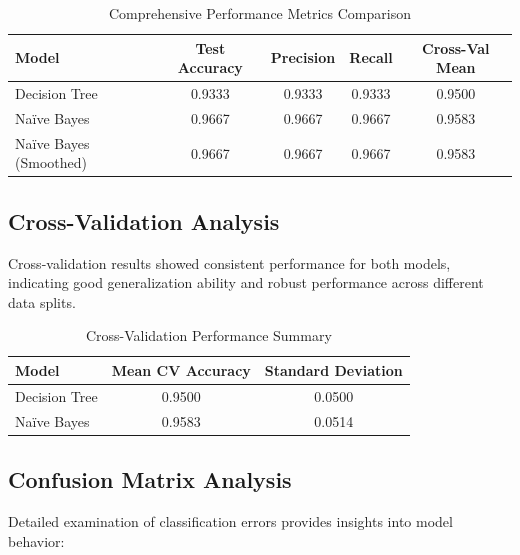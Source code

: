 \documentclass[12pt,a4paper]{article}
\newcommand{\tablealtrow}{\rowcolor{tablealt1}}
\begin{document}
\begin{table}[h!]
\centering
\renewcommand{\arraystretch}{1.4}
\begin{tabular}{|l|c|c|c|c|}
\hline
\rowcolor{tableheader}\textcolor{headertext}{\textbf{Model}} & \textcolor{headertext}{\textbf{Test Accuracy}} & \textcolor{headertext}{\textbf{Precision}} & \textcolor{headertext}{\textbf{Recall}} & \textcolor{headertext}{\textbf{Cross-Val Mean}} \\
\hline
\tablealtrow Decision Tree & 0.9333 & 0.9333 & 0.9333 & 0.9500 \\
\rowcolor{tablealt2} Na\"{i}ve Bayes & 0.9667 & 0.9667 & 0.9667 & 0.9583 \\
\tablealtrow Na\"{i}ve Bayes (Smoothed) & 0.9667 & 0.9667 & 0.9667 & 0.9583 \\
\hline
\end{tabular}
\caption{Comprehensive Performance Metrics Comparison}
\end{table}

\subsection{Cross-Validation Analysis}

Cross-validation results showed consistent performance for both models, indicating good generalization ability and robust performance across different data splits.

\begin{table}[h!]
\centering
\renewcommand{\arraystretch}{1.3}
\begin{tabular}{|l|c|c|}
\hline
\rowcolor{tableheader}\textcolor{headertext}{\textbf{Model}} & \textcolor{headertext}{\textbf{Mean CV Accuracy}} & \textcolor{headertext}{\textbf{Standard Deviation}} \\
\hline
\tablealtrow Decision Tree & 0.9500 & 0.0500 \\
\rowcolor{tablealt2} Na\"{i}ve Bayes & 0.9583 & 0.0514 \\
\hline
\end{tabular}
\caption{Cross-Validation Performance Summary}
\end{table}

\subsection{Confusion Matrix Analysis}

Detailed examination of classification errors provides insights into model behavior:
\end{document}
